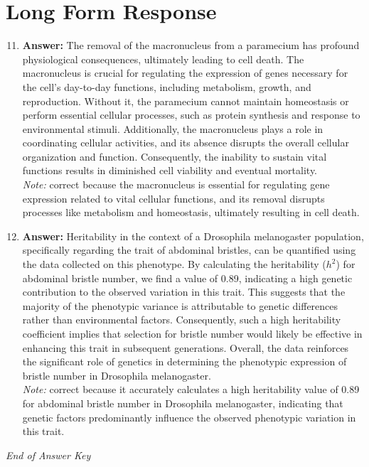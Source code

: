 \documentclass[12pt]{article}
\begin{document}
\section*{Long Form Response}
\begin{enumerate}[label=\arabic*.]
\setcounter{enumi}{10}
\item \textbf{Answer:} The removal of the macronucleus from a paramecium has profound physiological consequences, ultimately leading to cell death. The macronucleus is crucial for regulating the expression of genes necessary for the cell's day-to-day functions, including metabolism, growth, and reproduction. Without it, the paramecium cannot maintain homeostasis or perform essential cellular processes, such as protein synthesis and response to environmental stimuli. Additionally, the macronucleus plays a role in coordinating cellular activities, and its absence disrupts the overall cellular organization and function. Consequently, the inability to sustain vital functions results in diminished cell viability and eventual mortality.
\\ \textit{Note:} correct because the macronucleus is essential for regulating gene expression related to vital cellular functions, and its removal disrupts processes like metabolism and homeostasis, ultimately resulting in cell death.
\item \textbf{Answer:} Heritability in the context of a Drosophila melanogaster population, specifically regarding the trait of abdominal bristles, can be quantified using the data collected on this phenotype. By calculating the heritability ($h^2$) for abdominal bristle number, we find a value of 0.89, indicating a high genetic contribution to the observed variation in this trait. This suggests that the majority of the phenotypic variance is attributable to genetic differences rather than environmental factors. Consequently, such a high heritability coefficient implies that selection for bristle number would likely be effective in enhancing this trait in subsequent generations. Overall, the data reinforces the significant role of genetics in determining the phenotypic expression of bristle number in Drosophila melanogaster.
\\ \textit{Note:} correct because it accurately calculates a high heritability value of 0.89 for abdominal bristle number in Drosophila melanogaster, indicating that genetic factors predominantly influence the observed phenotypic variation in this trait.
\end{enumerate}

\vfill
\noindent\textit{End of Answer Key}
\end{document}
